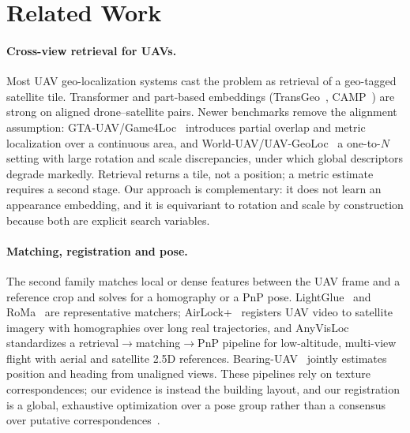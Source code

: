 \section{Related Work}
\label{sec:related}

\paragraph{Cross-view retrieval for UAVs.}
Most UAV geo-localization systems cast the problem as retrieval of a
geo-tagged satellite tile. Transformer and part-based embeddings
(TransGeo~\cite{zhu2022transgeo}, CAMP~\cite{wu2024camp}) are strong on
aligned drone--satellite pairs. Newer benchmarks remove the alignment
assumption: GTA-UAV/Game4Loc~\cite{ji2025game4loc} introduces partial overlap
and metric localization over a continuous area, and
World-UAV/UAV-GeoLoc~\cite{wu2025uavgeoloc} a one-to-$N$ setting with large
rotation and scale discrepancies, under which global descriptors degrade
markedly. Retrieval returns a tile, not a position; a metric estimate
requires a second stage. Our approach is complementary: it does not learn an
appearance embedding, and it is equivariant to rotation and scale by
construction because both are explicit search variables.

\paragraph{Matching, registration and pose.}
The second family matches local or dense features between the UAV frame and
a reference crop and solves for a homography or a PnP pose.
LightGlue~\cite{lindenberger2023lightglue} and RoMa~\cite{edstedt2024roma}
are representative matchers; AirLock+~\cite{deng2026airlock} registers
UAV video to satellite imagery with homographies over long real trajectories,
and AnyVisLoc~\cite{ye2026anyvisloc} standardizes a
retrieval$\rightarrow$matching$\rightarrow$PnP pipeline for low-altitude,
multi-view flight with aerial and satellite 2.5D references.
Bearing-UAV~\cite{liu2026bearinguav} jointly estimates position and heading
from unaligned views. These pipelines rely on texture correspondences; our
evidence is instead the building layout, and our registration is a global,
exhaustive optimization over a pose group rather than a consensus over
putative correspondences~\cite{fischler1981ransac}.


